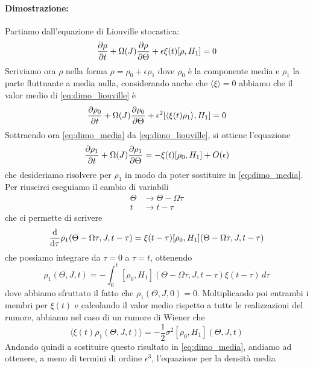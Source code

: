 \documentclass[10pt,a4paper]{article}
\begin{document}
\paragraph{Dimostrazione:}
Partiamo dall'equazione di Liouville stocastica:
\begin{equation}
	\pdv{\rho}{t} + \Omega(J) \pdv{\rho}{\Theta} + \epsilon\xi(t)[\rho,H_1] = 0
	\label{eq:dimo_liouville}
\end{equation}
Scriviamo ora $\rho$ nella forma $\rho = \rho_0 + \epsilon\rho_1$ dove $\rho_0$ è la componente media e $\rho_1$ la parte fluttuante a media nulla, considerando anche che $\langle\xi\rangle = 0$ abbiamo che il valor medio di \eqref{eq:dimo_liouville} è
\begin{equation}
	\pdv{\rho_0}{t} + \Omega(J)\pdv{\rho_0}{\Theta} + \epsilon^2[\langle\xi(t)\rho_1\rangle, H_1] = 0
	\label{eq:dimo_media}
\end{equation}
Sottraendo ora \eqref{eq:dimo_media} da \eqref{eq:dimo_liouville}, si ottiene l'equazione
\begin{equation}
	\pdv{\rho_1}{t} + \Omega(J) \pdv{\rho_1}{\Theta} = -\xi(t)[\rho_0, H_1] + O(\epsilon)
\end{equation}
che desideriamo risolvere per $\rho_1$ in modo da poter sostituire in \eqref{eq:dimo_media}. Per riuscirci eseguiamo il cambio di variabili
\begin{align}
	\Theta &\to \Theta - \Omega \tau \\
	t &\to t - \tau
\end{align}
che ci permette di scrivere
\begin{equation}
	\dv{}{\tau}\rho_1(\Theta - \Omega \tau, J, t - \tau) = \xi(t- \tau)[\rho_0, H_1](\Theta - \Omega \tau, J, t - \tau)
\end{equation}
che possiamo integrare da $\tau = 0$ a $\tau = t$, ottenendo
\begin{equation}
	\rho_1(\Theta, J, t) = -\int_0^t[\rho_0, H_1](\Theta - \Omega \tau, J, t - \tau)\xi(t-\tau)\,d\tau
\end{equation}
dove abbiamo sfruttato il fatto che $\rho_1(\Theta, J, 0)=0$. Moltiplicando poi entrambi i membri per $\xi(t)$ e calcolando il valor medio rispetto a tutte le realizzazioni del rumore, abbiamo nel caso di un rumore di Wiener che
\begin{equation}
	\langle \xi(t)\rho_1(\Theta, J, t) \rangle = -\frac{1}{2}\sigma^2 [\rho_0, H_1](\Theta, J, t)
\end{equation}
Andando quindi a sostituire questo risultato in \eqref{eq:dimo_media}, andiamo ad ottenere, a meno di termini di ordine $\epsilon^3$, l'equazione per la densità media
\end{document}
